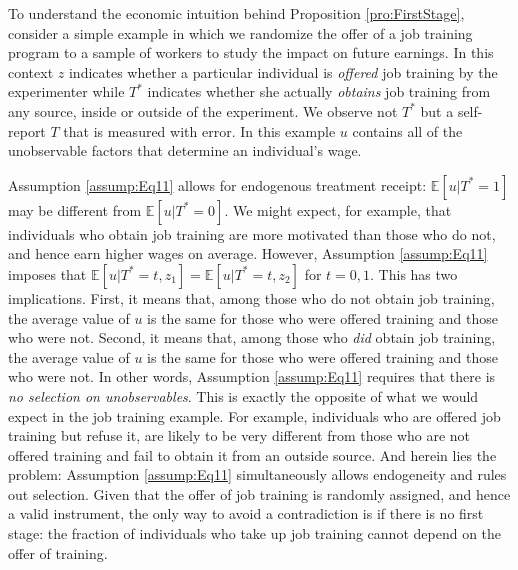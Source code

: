 To understand the economic intuition behind Proposition \ref{pro:FirstStage}, consider a simple example in which we randomize the offer of a job training program to a sample of workers to study the impact on future earnings.
In this context $z$ indicates whether a particular individual is \emph{offered} job training by the experimenter while $T^*$ indicates whether she actually \emph{obtains} job training from any source, inside or outside of the experiment.
We observe not $T^*$ but a self-report $T$ that is measured with error.
In this example $u$ contains all of the unobservable factors that determine an individual's wage.

Assumption \ref{assump:Eq11} allows for endogenous treatment receipt: $\mathbb{E}[u|T^*=1]$ may be different from $\mathbb{E}[u|T^*=0]$.
We might expect, for example, that individuals who obtain job training are more motivated than those who do not, and hence earn higher wages on average. 
However, Assumption \ref{assump:Eq11} imposes that $\mathbb{E}\left[u|T^*=t,z_1 \right]=\mathbb{E}\left[ u|T^*=t,z_2 \right]$ for $t=0,1$.
This has two implications.
First, it means that, among those who do not obtain job training, the average value of $u$ is the same for those who were offered training and those who were not.
Second, it means that, among those who \emph{did} obtain job training, the average value of $u$ is the same for those who were offered training and those who were not.
In other words, Assumption \ref{assump:Eq11} requires that there is \emph{no selection on unobservables}.
This is exactly the opposite of what we would expect in the job training example.
For example, individuals who are offered job training but refuse it, are likely to be very different from those who are not offered training and fail to obtain it from an outside source. 
And herein lies the problem: Assumption \ref{assump:Eq11} simultaneously allows endogeneity and rules out selection.
Given that the offer of job training is randomly assigned, and hence a valid instrument, the only way to avoid a contradiction is if there is no first stage: the fraction of individuals who take up job training cannot depend on the offer of training.
